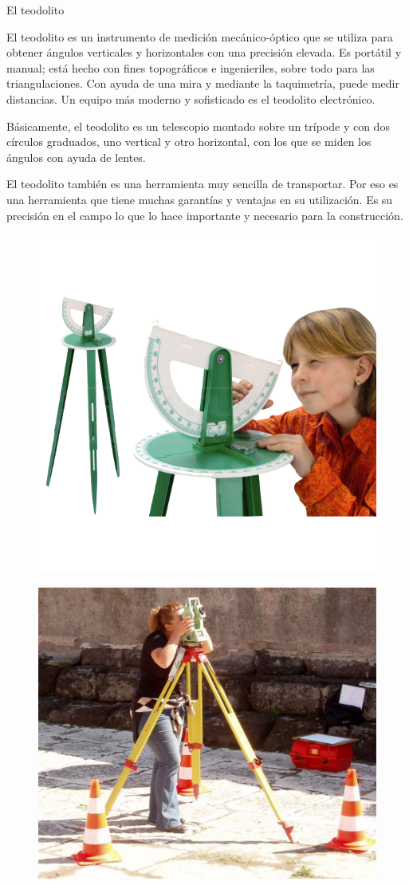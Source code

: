\begin{myexampleblock}{El teodolito}

\vspace{2mm} El teodolito es un instrumento de medición mecánico-óptico que se utiliza para obtener ángulos verticales y horizontales con  una precisión elevada. Es portátil y manual; está hecho con fines topográficos e ingenieriles, sobre todo para las triangulaciones. Con ayuda de una mira y mediante la taquimetría, puede medir distancias. Un equipo más moderno y sofisticado es el teodolito electrónico.

\vspace{2mm} Básicamente, el teodolito es un telescopio montado sobre un trípode y con dos círculos graduados, uno vertical y otro horizontal, con los que se miden los ángulos con ayuda de lentes.

\vspace{2mm} El teodolito también es una herramienta muy sencilla de transportar. Por eso es una herramienta que tiene muchas garantías y ventajas en su utilización. Es su precisión en el campo lo que lo hace importante y necesario para la construcción.

\begin{multicols}{2}
\begin{figure}[H]
	\centering
	\includegraphics[width=.4\textwidth]{img-triang/teodolito.png}
\end{figure}
\begin{figure}[H]
	\centering
	\includegraphics[width=.4\textwidth]{img-triang/teodolitop.png}
\end{figure}
\end{multicols}
	
\end{myexampleblock}

